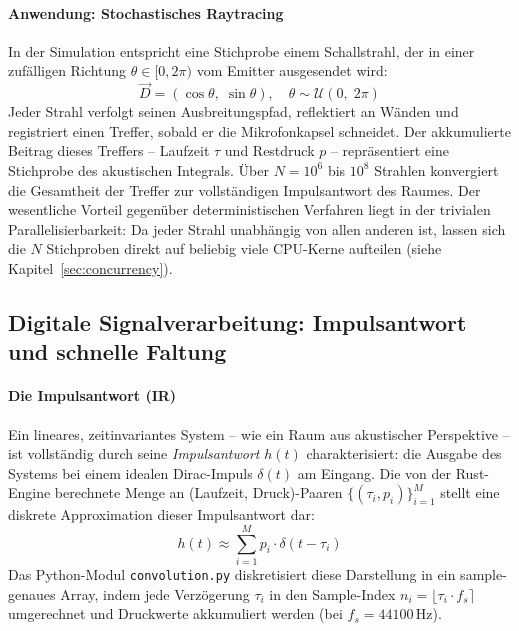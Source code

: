 \documentclass{article}
\begin{document}
    \paragraph{Anwendung: Stochastisches Raytracing}

    In der Simulation entspricht eine Stichprobe einem Schallstrahl, der in einer zufälligen
    Richtung $\theta \in [0, 2\pi)$ vom Emitter ausgesendet wird:
    \[\vec{D} = (\cos\theta,\; \sin\theta), \quad \theta \sim \mathcal{U}(0,\; 2\pi)\]
    Jeder Strahl verfolgt seinen Ausbreitungspfad, reflektiert an Wänden und registriert
    einen Treffer, sobald er die Mikrofonkapsel schneidet. Der akkumulierte Beitrag dieses
    Treffers -- Laufzeit $\tau$ und Restdruck $p$ -- repräsentiert eine Stichprobe des
    akustischen Integrals. Über $N = 10^6$ bis $10^8$ Strahlen konvergiert die Gesamtheit
    der Treffer zur vollständigen Impulsantwort des Raumes.
    Der wesentliche Vorteil gegenüber deterministischen Verfahren liegt in der trivialen
    Parallelisierbarkeit: Da jeder Strahl unabhängig von allen anderen ist, lassen sich die
    $N$ Stichproben direkt auf beliebig viele CPU-Kerne aufteilen
    (siehe Kapitel~\ref{sec:concurrency}).

    \subsection{Digitale Signalverarbeitung: Impulsantwort und schnelle Faltung}
    \label{subsec:dsp}

    \paragraph{Die Impulsantwort (IR)}

    Ein lineares, zeitinvariantes System -- wie ein Raum aus akustischer Perspektive -- ist
    vollständig durch seine \emph{Impulsantwort} $h(t)$ charakterisiert: die Ausgabe des
    Systems bei einem idealen Dirac-Impuls $\delta(t)$ am Eingang.
    Die von der Rust-Engine berechnete Menge an (Laufzeit, Druck)-Paaren
    $\{(\tau_i, p_i)\}_{i=1}^{M}$ stellt eine diskrete Approximation dieser Impulsantwort dar:
    \[h(t) \approx \sum_{i=1}^{M} p_i \cdot \delta(t - \tau_i)\]
    Das Python-Modul \texttt{convolution.py} diskretisiert diese Darstellung in ein
    sample-genaues Array, indem jede Verzögerung $\tau_i$ in den Sample-Index
    $n_i = \lfloor \tau_i \cdot f_s \rceil$ umgerechnet und Druckwerte akkumuliert werden
    (bei $f_s = 44100\,\text{Hz}$).
\end{document}
